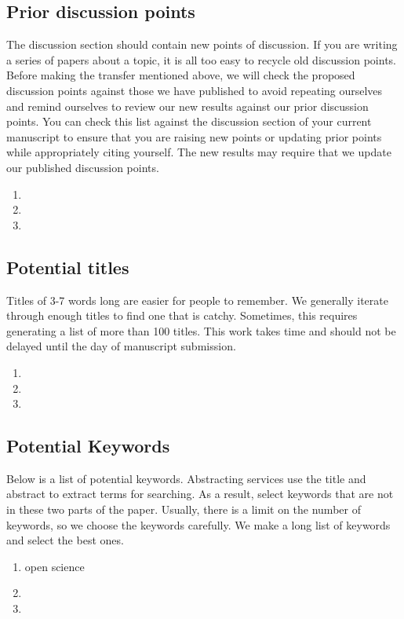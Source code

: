 \documentclass[10pt,letterpaper]{article}
\newcommand{\be}{\begin{enumerate}}
\newcommand{\ee}{\end{enumerate}}
\begin{document}
\subsection{Prior discussion points}
\label{subsec:priorDiscussion}
The discussion section should contain new points of discussion.
If you are writing a series of papers about a topic, it is all too easy to recycle old discussion points.
Before making the transfer mentioned above, we will check the proposed discussion points against those we have published to avoid repeating ourselves and remind ourselves to review our new results against our prior discussion points.
You can check this list against the discussion section of your current manuscript to ensure that you are raising new points or updating prior points while appropriately citing yourself. 
The new results may require that we update our published discussion points.


\begin{enumerate}
  \item 
  \item
  \item
\end{enumerate}



\subsection{Potential titles}
\label{sub:titles}

Titles of 3-7 words long are easier for people to remember.
We generally iterate through enough titles to find one that is catchy.
Sometimes, this requires generating a list of more than 100 titles.
This work takes time and should not be delayed until the day of manuscript submission.


\begin{enumerate}
  \item 
  \item 
  \item
\end{enumerate}



\subsection*{Potential Keywords}
\label{sub:keywords}

Below is a list of potential keywords.
Abstracting services use the title and abstract to extract terms for searching.
As a result, select keywords that are not in these two parts of the paper.
Usually, there is a limit on the number of keywords, so we choose the keywords carefully.
We make a long list of keywords and select the best ones.              
\be
    \item open science
    \item 
    \item 
\ee
\end{document}
